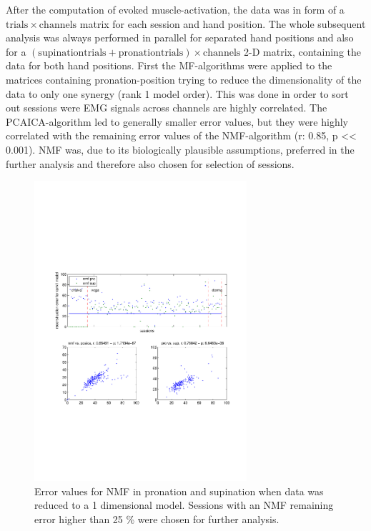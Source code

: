 After the computation of evoked muscle-activation, the data was in form of a $\mathrm{trials} \times \mathrm{channels}$ matrix for each session and hand position. The whole subsequent analysis was always performed in parallel for separated hand positions and also for a $(\mathrm{supination trials} + \mathrm{pronation trials}) \times \mathrm{channels}$ 2-D matrix, containing the data for both hand positions. First the MF-algorithms were applied to the matrices containing pronation-position trying to reduce the dimensionality of the data to only one synergy (rank 1 model order). This was done in order to sort out sessions were EMG signals across channels are highly correlated. The PCAICA-algorithm led to generally smaller error values, but they were highly correlated with the remaining error values of the NMF-algorithm (r: 0.85, p << 0.001). NMF was, due to its biologically plausible assumptions, preferred in the further analysis and therefore also chosen for selection of sessions. 

\begin{figure}[ht]
	\centering
		\includegraphics[width=0.7\textwidth]{images/rank1.pdf}
	\caption{
Error values for NMF in pronation and supination when data was reduced to a 1 dimensional model. Sessions with an NMF remaining error higher than 25 \% were chosen for further analysis.
	}
	\label{sg:fig:images_rank1}
\end{figure}


